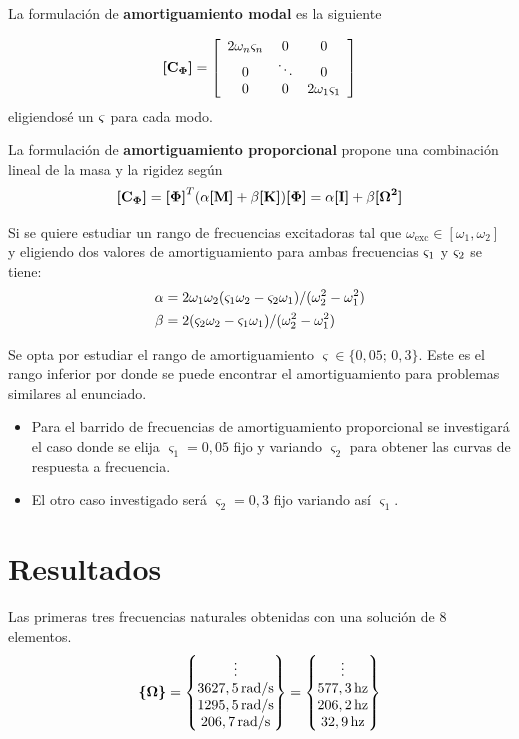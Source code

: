 \documentclass[onecolumn,10pt,titlepage,a4paper]{article}
\begin{document}
La formulación de \textbf{amortiguamiento modal} es la siguiente

\begin{equation}
\Mme{C\modal}=\left[ \begin{array}{ccc}{2 \omega_{n} \dampfact_{n}} & {0} & {0} \\ {0} & {\ddots} & {0} \\ {0} & {0} & {2 \omega_{1} \dampfact_{1}}\end{array}\right]
\end{equation}
eligiendosé un $\dampfact$ para cada modo.

La formulación de \textbf{amortiguamiento proporcional} propone una combinación lineal de la masa y la rigidez según
\begin{equation} \label{eq:proporcional}
\Mme{C\modal} = \Mme{\Phib}^T ( \alpha \Mme{M}+\beta \Mme{K})\Mme{\Phib} = \alpha \Mme{I} +\beta \Mme{\Omegab^2}
\end{equation}

Si se quiere estudiar un rango de frecuencias excitadoras tal que $\omega_{\mathrm{exc}}\in [\omega_1, \omega_2]$ y eligiendo dos valores de amortiguamiento para ambas frecuencias $\dampfact_1$ y $\dampfact_2$ se tiene: \cite{cook2007concepts}
\begin{align} \label{eq:alfabeta}
\alpha &= 2\omega_1 \omega_2 (\dampfact_1 \omega_2 -\dampfact_2 \omega_1)/(\omega_2^2 - \omega_1^2) \\ \beta &= 2(\dampfact_2\omega_2 -\dampfact_1 \omega_1)/(\omega_2^2 - \omega_1^2)
\end{align}

Se opta por estudiar el rango de amortiguamiento  $\varsigma\in \{0,05;\, 0,3\}$. Este es el rango inferior por donde se puede encontrar el amortiguamiento para problemas similares al enunciado.
\begin{itemize}
	\item Para el barrido de frecuencias de amortiguamiento proporcional se investigará el caso donde se elija $\varsigma_1=0,05$ fijo y variando $\varsigma_2$ para obtener las curvas de respuesta a frecuencia.
	\item El otro caso investigado será $\varsigma_2=0,3$ fijo variando así $\varsigma_1$.
\end{itemize}

\section{Resultados}
Las primeras tres frecuencias naturales obtenidas con una solución de 8 elementos.
\[
\Cme{\Omega} = \begin{Bmatrix}
\vdots \\
3627,5 \si{\, \radian \per \second}\\
1295,5 \si{\, \radian \per \second}\\
 206,7 \si{\, \radian \per \second}
\end{Bmatrix}=\begin{Bmatrix}
\vdots \\
577,3\, \textrm{hz}\\
206,2\, \textrm{hz}\\
32,9\, \textrm{hz} 
\end{Bmatrix}
\]
\end{document}
